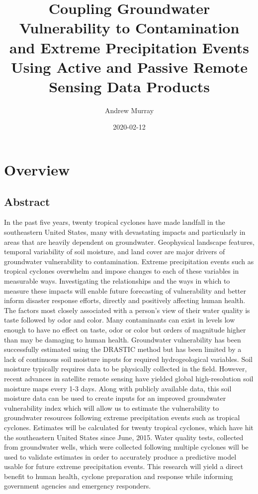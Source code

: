 \documentclass[
]{book}
\title{Coupling Groundwater Vulnerability to Contamination and Extreme Precipitation Events Using Active and Passive Remote Sensing Data Products}
\author{Andrew Murray}
\date{2020-02-12}
\begin{document}
\maketitle

{
\setcounter{tocdepth}{1}
\tableofcontents
}
\hypertarget{overview}{%
\chapter{Overview}\label{overview}}

\hypertarget{abstract}{%
\section{Abstract}\label{abstract}}

In the past five years, twenty tropical cyclones have made landfall in the southeastern United States, many with devastating impacts and particularly in areas that are heavily dependent on groundwater. Geophysical landscape features, temporal variability of soil moisture, and land cover are major drivers of groundwater vulnerability to contamination. Extreme precipitation events such as tropical cyclones overwhelm and impose changes to each of these variables in measurable ways. Investigating the relationships and the ways in which to measure these impacts will enable future forecasting of vulnerability and better inform disaster response efforts, directly and positively affecting human health.
The factors most closely associated with a person's view of their water quality is taste followed by odor and color. Many contaminants can exist in levels low enough to have no effect on taste, odor or color but orders of magnitude higher than may be damaging to human health. Groundwater vulnerability has been successfully estimated using the DRASTIC method but has been limited by a lack of continuous soil moisture inputs for required hydrogeological variables. Soil moisture typically requires data to be physically collected in the field. However, recent advances in satellite remote sensing have yielded global high-resolution soil moisture maps every 1-3 days. Along with publicly available data, this soil moisture data can be used to create inputs for an improved groundwater vulnerability index which will allow us to estimate the vulnerability to groundwater resources following extreme precipitation events such as tropical cyclones. Estimates will be calculated for twenty tropical cyclones, which have hit the southeastern United States since June, 2015. Water quality tests, collected from groundwater wells, which were collected following multiple cyclones will be used to validate estimates in order to accurately produce a predictive model usable for future extreme precipitation events. This research will yield a direct benefit to human health, cyclone preparation and response while informing government agencies and emergency responders.
\end{document}
